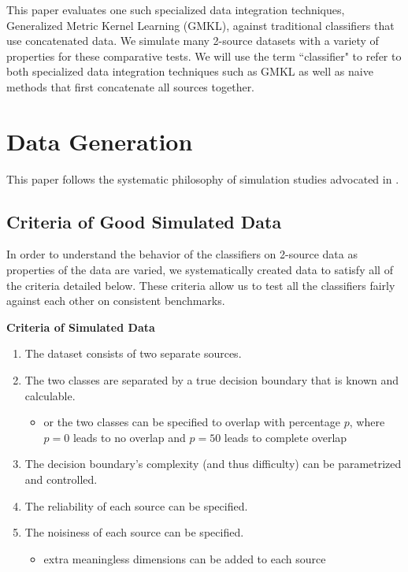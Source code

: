 \documentclass{article}
\begin{document}
This paper evaluates one such specialized data integration techniques,
Generalized Metric Kernel Learning (GMKL), against traditional classifiers that
use concatenated data. We simulate many 2-source datasets with a variety of
properties for these comparative tests. We will use the term ``classifier" to
refer to both specialized data integration techniques such as GMKL as well as
naive methods that first concatenate all sources together.












\section*{Data Generation}

This paper follows the systematic philosophy of simulation studies advocated in
\cite{neto2014simulation}.


\subsection*{Criteria of Good Simulated Data}

In order to understand the behavior of the classifiers on 2-source data as
properties of the data are varied, we systematically created data to satisfy
all of the criteria detailed below. These criteria allow us to test all
the classifiers fairly against each other on consistent benchmarks.
\newline

\begin{minipage}{\textwidth}
\centering
\textbf{Criteria of Simulated Data}
\begin{enumerate}
    \item The dataset consists of two separate sources.
    \item \label{itm:separable} The two classes are separated by a true
        decision boundary that is known and calculable.
    \begin{itemize}
        \item or the two classes can be specified to overlap with percentage
            $p$, where $p=0$ leads to no overlap and $p=50$ leads to complete
            overlap
    \end{itemize}
    \item The decision boundary's complexity (and thus difficulty) can be
        parametrized and controlled.
    \item The reliability of each source can be specified.
    \item The noisiness of each source can be specified.
    \begin{itemize}
        \item \label{itm:noisy} extra meaningless dimensions can be
            added to each source
    \end{itemize}
\end{enumerate}
\label{tab:criteria}
\end{minipage}
\end{document}
